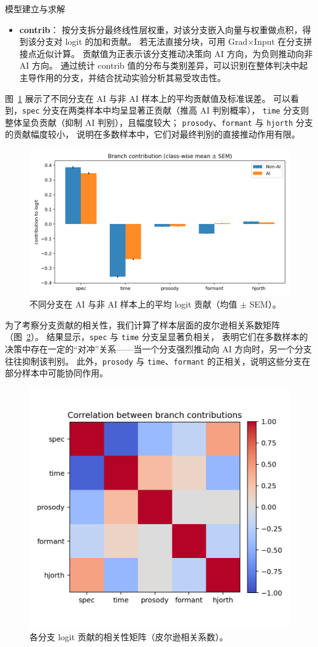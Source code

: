 \documentclass[aspectratio=169]{beamer}
\begin{document}
\begin{frame}{模型建立与求解}
\begin{itemize}
  \item \textbf{contrib}：
  按分支拆分最终线性层权重，对该分支嵌入向量与权重做点积，得到该分支对 logit 的加和贡献。
  若无法直接分块，可用 Grad$\times$Input 在分支拼接点近似计算。
  贡献值为正表示该分支推动决策向 AI 方向，为负则推动向非 AI 方向。
  通过统计 contrib 值的分布与类别差异，可以识别在整体判决中起主导作用的分支，并结合扰动实验分析其易受攻击性。
\end{itemize}

图~\ref{fig:contrib_means} 展示了不同分支在 AI 与非 AI 样本上的平均贡献值及标准误差。
可以看到，\texttt{spec} 分支在两类样本中均呈显著正贡献（推高 AI 判别概率），
\texttt{time} 分支则整体呈负贡献（抑制 AI 判别），且幅度较大；
\texttt{prosody}、\texttt{formant} 与 \texttt{hjorth} 分支的贡献幅度较小，
说明在多数样本中，它们对最终判别的直接推动作用有限。

\begin{figure}[H]
  \centering
  \includegraphics[width=.75\linewidth]{images_in_paper/contrib_means_by_class.png}
  \caption{不同分支在 AI 与非 AI 样本上的平均 logit 贡献（均值 $\pm$ SEM）。}
  \label{fig:contrib_means}
\end{figure}

为了考察分支贡献的相关性，我们计算了样本层面的皮尔逊相关系数矩阵（图~\ref{fig:contrib_corr}）。
结果显示，\texttt{spec} 与 \texttt{time} 分支呈显著负相关，
表明它们在多数样本的决策中存在一定的“对冲”关系——当一个分支强烈推动向 AI 方向时，另一个分支往往抑制该判别。
此外，\texttt{prosody} 与 \texttt{time}、\texttt{formant} 的正相关，说明这些分支在部分样本中可能协同作用。

\begin{figure}[H]
  \centering
  \includegraphics[width=.5\linewidth]{images_in_paper/contrib_correlation.png}
  \caption{各分支 logit 贡献的相关性矩阵（皮尔逊相关系数）。}
  \label{fig:contrib_corr}
\end{figure}


\end{frame}
\end{document}
